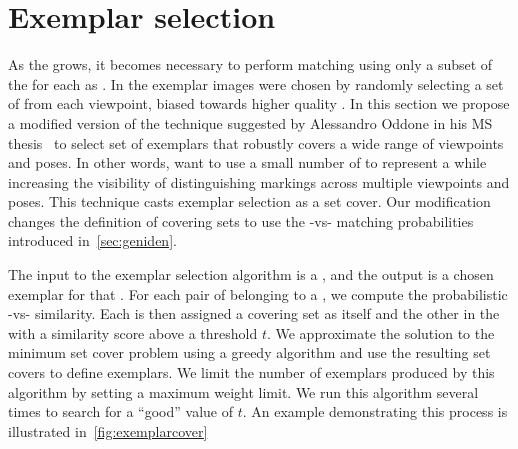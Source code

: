 \section{Exemplar selection}\label{sec:exempselect}
    As the \masterdatabase{} grows, it becomes necessary to perform matching
      using only a subset of the \annots{} for each \name{} as \exemplars{}.
    In the \GZC{} exemplar images were chosen by randomly selecting a set of
      \annots{} from each viewpoint, biased towards higher quality \annots{}.
    In this section we propose a modified version of the technique suggested
      by Alessandro Oddone in his MS thesis~\cite{oddone_mobile_2016} to select
      set of exemplars that robustly covers a wide range of viewpoints and
      poses.
    In other words, want to use a small number of \annots{} to represent a
      \name{} while increasing the visibility of distinguishing markings across
      multiple viewpoints and poses.
    This technique casts exemplar selection as a set cover.
    Our modification changes the definition of covering sets to use the
      \annot{}-vs-\annot{} matching probabilities introduced
      in~\cref{sec:geniden}.

    The input to the exemplar selection algorithm is a \name{}, and the output
      is a chosen exemplar \annots{} for that \name{}.
    For each pair of \annots{} belonging to a \name{}, we compute the
      probabilistic \annot{}-vs-\annot{} similarity.
    Each \annot{} is then assigned a covering set as itself and the other
      \annots{} in the \name{} with a similarity score above a threshold $t$.
    We approximate the solution to the minimum set cover problem using a
      greedy algorithm and use the resulting set covers to define exemplars.
    We limit the number of exemplars produced by this algorithm by setting a
      maximum weight limit.
    We run this algorithm several times to search for a ``good'' value of $t$.
    An example demonstrating this process is illustrated
      in~\cref{fig:exemplarcover}

    \exemplarcover{}

